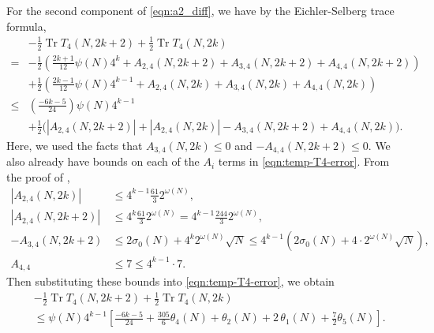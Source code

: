 \documentclass[11pt,letterpaper,reqno]{amsart}
\numberwithin{figure}{section}
\numberwithin{table}{section}
\theoremstyle{definition}
\theoremstyle{plain}
\newcommand{\lrabs}[1]{\left\lvert #1 \right\lvert}
\newcommand{\lrp}[1]{\left(#1\right)}
\newcommand{\lrb}[1]{\left[#1\right]}
\theoremstyle{definition}
\theoremstyle{definition}
\theoremstyle{remark}
\numberwithin{equation}{section}
\DeclareMathOperator{\Tr}{Tr}
\begin{document}
For the second component of \eqref{eqn:a2_diff}, we have by the Eichler-Selberg trace formula,
\begin{align}
& -\frac{1}{2}\Tr T_4(N, 2k+2) + \frac{1}{2}\Tr T_4(N, 2k) \\
=& -\frac{1}{2}\left(\frac{2k+1}{12}\psi(N)4^{k}+A_{2,4}(N,2k+2)+A_{3,4}(N,2k+2)+A_{4,4}(N,2k+2) 
 \right) \\
&+\frac{1}{2}\left(\frac{2k-1}{12}\psi(N)4^{k-1}+A_{2,4}(N,2k)+A_{3,4}(N,2k)+A_{4,4}(N,2k)\right) \\
\leq & \lrp{ \frac{-6k-5}{24} } \psi(N) 4^{k-1}  \\
&+ \frac12 \Big(
    \lrabs{A_{2,4}(N,2k+2)} + \lrabs{A_{2,4}(N,2k)} - A_{3,4}(N,2k+2) + A_{4,4}(N,2k)
\Big). \label{eqn:temp-T4-error}
\end{align}
Here, we used the facts that $A_{3,4}(N,2k) \leq 0$ and $-A_{4,4}(N,2k+2) \leq 0$.
We also already have bounds on each of the $A_i$ terms in \eqref{eqn:temp-T4-error}. From the proof of \cite[Proposition 4.7]{previousPaper},
\begin{equation}
\begin{alignedat}{1}
    |A_{2,4}(N,2k)| &\leq 4^{k-1}  \frac{61}{3} 2^{\omega(N)}, \\
    |A_{2,4}(N,2k+2)| &\leq 4^{k}  \frac{61}{3} 2^{\omega(N)} = 4^{k-1} \frac{244}{3} 2^{\omega(N)},
    \\
    -A_{3,4}(N, 2k+2) &\leq 2\sigma_0(N)+4^{k}2^{\omega(N)}\sqrt{N} \leq 4^{k-1} \lrp{ 2 \sigma_0(N) + 4 \cdot  2^{\omega(N)}\sqrt{N}},  \\
    A_{4,4} &\leq 7 \leq 4^{k-1} \cdot 7.
\end{alignedat}
\end{equation}
Then substituting these bounds into \eqref{eqn:temp-T4-error}, we obtain
\begin{align}
& -\frac{1}{2}\Tr T_4(N, 2k+2) + \frac{1}{2}\Tr T_4(N, 2k) \\
&\leq \psi(N) 4^{k-1} \lrb{\frac{-6k-5}{24} + \frac{305}{6} \theta_4(N) +  \theta_2(N) + 2\, \theta_1(N) + \frac72 \theta_5(N)  }.   
 \label{eqn:component2}
\end{align}
\end{document}

